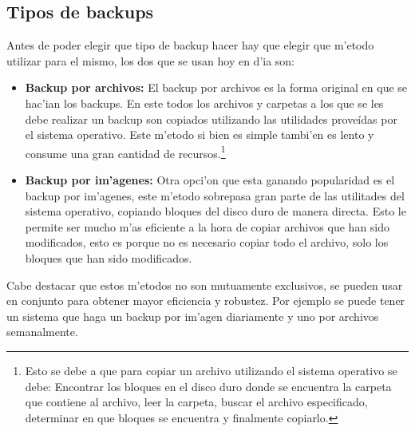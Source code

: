 \documentclass[11pt]{article}
\newcommand{\customitem}[1]{\item \textbf{#1:}}
\begin{document}
	 \subsection{Tipos de backups}
		Antes de poder elegir que tipo de backup hacer hay que elegir que m'etodo utilizar para el mismo, los dos que se usan hoy en d'ia son:
		\begin{itemize}
			\customitem{Backup por archivos} El backup por archivos es la forma original en que se hac'ian los backups. En este todos los archivos y carpetas a los que se les debe realizar un backup son copiados utilizando las utilidades proveídas por el sistema operativo. Este m'etodo si bien es simple tambi'en es lento y consume una gran cantidad de recursos.\footnote{Esto se debe a que para copiar un archivo utilizando el sistema operativo se debe: Encontrar los bloques en el disco duro donde se encuentra la carpeta que contiene al archivo, leer la carpeta, buscar el archivo especificado, determinar en que bloques se encuentra y finalmente copiarlo.}
			\customitem{Backup por im'agenes} Otra opci'on que esta ganando popularidad es el backup por im'agenes, este m'etodo sobrepasa gran parte de las utilitades del sistema operativo, copiando bloques del disco duro de manera directa. Esto le permite ser mucho m'as eficiente a la hora de copiar archivos que han sido modificados, esto es porque no es necesario copiar todo el archivo, solo los bloques que han sido modificados. 
		\end{itemize}

		Cabe destacar que estos m'etodos no son mutuamente exclusivos, se pueden usar en conjunto para obtener mayor eficiencia y robustez. Por ejemplo se puede tener un sistema que haga un backup por im'agen diariamente y uno por archivos semanalmente.
\end{document}
